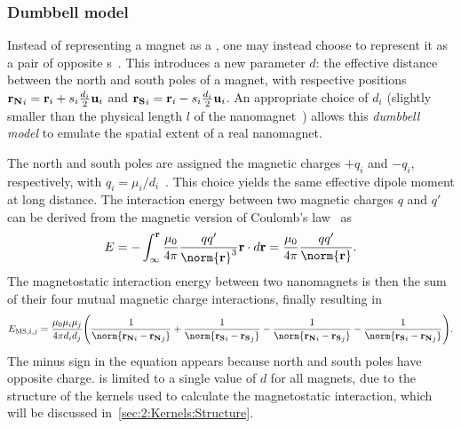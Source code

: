 \subsubsection{Dumbbell model}\label{sec:2:Dumbbell}
Instead of representing a magnet as a , one may instead choose to represent it as a pair of opposite s~\cite{MagneticMonopoles2008,MagneticMonopoleDynamics}.
This introduces a new parameter $d$: the effective distance between the north and south poles of a magnet, with respective positions $\boldsymbol{\mathbf{r_N}}_i = \boldsymbol{\mathbf{r}}_i + s_i\frac{d_i}{2}\boldsymbol{\mathbf{u}}_i$ and $\boldsymbol{\mathbf{r_S}}_i = \boldsymbol{\mathbf{r}}_i - s_i\frac{d_i}{2}\boldsymbol{\mathbf{u}}_i$.
An appropriate choice of $d_i$ (slightly smaller than the physical length $l$ of the nanomagnet~\cite{DDG_Masterproef}) allows this \emph{dumbbell model} to emulate the spatial extent of a real nanomagnet. \par
The north and south poles are assigned the magnetic charges $+q_i$ and $-q_i$, respectively, with $q_i=\mu_i/d_i$~\cite{MagneticMonopoles2008}.
This choice yields the same effective dipole moment at long distance.
The interaction energy between two magnetic charges $q$ and $q'$ can be derived from the magnetic version of Coulomb's law~\cite{ForceMagneticDipole} as
\begin{equation}
	E = -\int_\infty^{\vc{r}} \frac{\mu_0}{\num{4}\pi}\frac{qq'}{\norm{\vc{r}}^3} \vc{r} \cdot d\vc{r} = \frac{\mu_0}{\num{4}\pi} \frac{qq'}{\norm{\vc{r}}} \mathrm{.}
\end{equation}
The magnetostatic interaction energy between two nanomagnets is then the sum of their four mutual magnetic charge interactions, finally resulting in
\begin{equation}
	\label{eq:2:E_MS_mono}
	E_{\mathrm{MS},i,j} = \frac{\mu_0 \mu_i \mu_j}{4\pi d_i d_j} \Bigg(\frac{1}{\norm{\mathbf{r_N}_i - \mathbf{r_N}_j}} + \frac{1}{\norm{\mathbf{r_S}_i - \mathbf{r_S}_j}}\\ - \frac{1}{\norm{\mathbf{r_N}_i - \mathbf{r_S}_j}} - \frac{1}{\norm{\mathbf{r_S}_i - \mathbf{r_N}_j}}\Bigg) \mathrm{.}
\end{equation}
The minus sign in the equation appears because north and south poles have opposite charge.
\hotspice is limited to a single value of $d$ for all magnets, due to the structure of the kernels used to calculate the magnetostatic interaction, which will be discussed in~\cref{sec:2:Kernels:Structure}.

